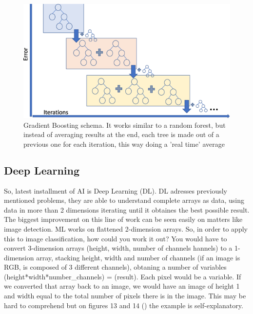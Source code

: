 \documentclass[openany]{article}
\begin{document}
\begin{figure}[!h]
    \centering
    \includegraphics[width=\textwidth]{Gradient Boosting.png}
    \caption{Gradient Boosting schema. It works similar to a random forest, but instead of averaging results at the end, each tree is made out of a previous one for each iteration, this way doing a 'real time' average}
    \label{fig:my_label}
\end{figure}


\newpage 


\subsection{Deep Learning}

So, latest installment of AI is Deep Learning (DL). DL adresses previously mentioned problems, they are able to understand complete arrays as data, using data in more than 2 dimensions iterating until it obtaines the best possible result. The biggest improvement on this line of work can be seen easily on matters like image detection. ML works on flattened 2-dimension arrays. So, in order to apply this to image classification, how could you work it out? You would have to convert 3-dimension arrays (height, width, number of channels hannels) to a 1-dimension array, stacking height, width and number of channels (if an image is RGB, is composed of 3 different channels), obtaning a number of variables (height*width*number\_channels) = (result). Each pixel would be a variable. If we converted that array back to an image, we would have an image of height 1 and width equal to the total number of pixels there is in the image. This may be hard to comprehend but on figures 13 and 14 (\cite{Dog}) the example is self-explanatory.
\end{document}
